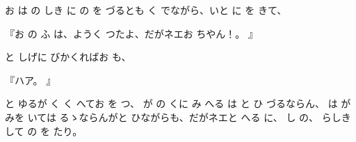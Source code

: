 
お
は
の
しき
に
の
を
づるとも
く
でながら、いと
に
を
きて、

『お
の
ふ
は、ようく
つたよ、だがネエお
ちやん！。
』

と
しげに
びかくればお
も、

『ハア。
』

と
ゆるが
く
く
へてお
を
つ、
が
の
くに
み
へる
は
と
ひ
づるならん、
は
が
みを
いては
るゝならんがと
ひながらも、だがネエと
へる
に、
し
の、
らしき
して
の
を
たり。

